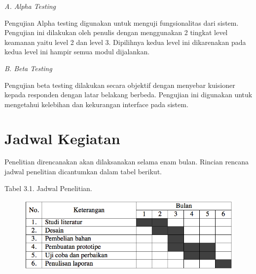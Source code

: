\documentclass{jtetiproposalskripsi}
\begin{document}
\textsl{A. Alpha Testing}

Pengujian Alpha testing digunakan untuk menguji fungsionalitas dari sistem. Pengujian ini dilakukan oleh penulis dengan menggunakan 2 tingkat level keamanan yaitu level 2 dan level 3. Dipilihnya kedua level ini dikarenakan pada kedua level ini hampir semua modul dijalankan.

\textsl{B. Beta Testing}

Pengujian beta testing dilakukan secara objektif dengan menyebar kuisioner kepada responden dengan latar belakang berbeda. Pengujian ini digunakan untuk mengetahui kelebihan dan kekurangan interface pada sistem.


\section{Jadwal Kegiatan}
Penelitian direncanakan akan dilaksanakan selama enam bulan. Rincian rencana jadwal penelitian dicantumkan dalam tabel berikut.

\begin{center}
Tabel 3.1. Jadwal Penelitian.
\end{center}
\vspace{-0.5cm}
\begin{figure}[ht!]
  \centering
    \includegraphics[width=13cm]{gambar/timeline}
\end{figure}

\end{document}
